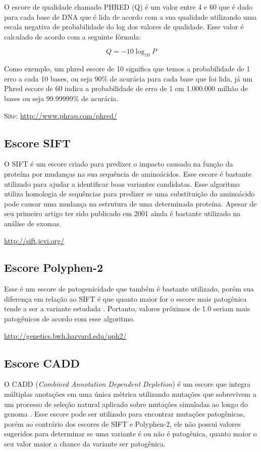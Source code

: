 O escore de qualidade chamado PHRED (Q) é um valor entre 4 e 60 que é dado para cada base de DNA que é lida de acordo com a sua qualidade utilizando uma escala negativa de probabilidade do log dos valores de qualidade. Esse valor é calculado de acordo com a seguinte fórmula:

\[Q=-10\log_{10}P\]

Como exemplo, um phred escore de 10 significa que temos a probabilidade de 1 erro a cada 10 bases, ou seja 90\% de acurácia para cada base que foi lida, já um Phred escore de 60 indica a probabilidade de erro de 1 em 1.000.000 milhão de bases ou seja 99.99999\% de acurácia.

Site: \url{http://www.phrap.com/phred/}

\subsection{Escore SIFT}

O SIFT \cite{Ng2003} é um escore criado para predizer o impacto causado na função da proteína por mudanças na sua sequência de aminoácidos. Esse escore é bastante utilizado para ajudar a identificar boas variantes candidatas. Esse algoritmo utiliza homologia de sequências para predizer se uma substituição do aminoácido pode causar uma mudança na estrutura de uma determinada proteína. Apesar de seu primeiro artigo ter sido publicado em 2001 ainda é bastante utilizado na análise de exomas.

\url{http://sift.jcvi.org/}

\subsection{Escore Polyphen-2}

Esse é um escore de patogenicidade que também é bastante utilizado, porém sua diferença em relação ao SIFT é que quanto maior for o escore mais patogênica tende a ser a variante estudada \cite{Adzhubei2013}. Portanto, valores próximos de 1.0 seriam mais patogênicos de acordo com esse algoritmo.

\url{http://genetics.bwh.harvard.edu/pph2/}

\subsection{Escore CADD}
 
O CADD (\textit{Combined Annotation Dependent Depletion}) é um escore que integra múltiplas anotações em uma única métrica utilizando mutações que sobrevivem a um processo de seleção natural aplicado sobre mutações simuladas ao longo do genoma \cite{Kircher2014a}. Esse escore pode ser utilizado para encontrar mutações patogênicas, porém ao contrário dos escores de SIFT e Polyphen-2, ele não possui valores sugeridos para determinar se uma variante é ou não é patogênica, quanto maior o seu valor maior a chance da variante ser patogênica.


